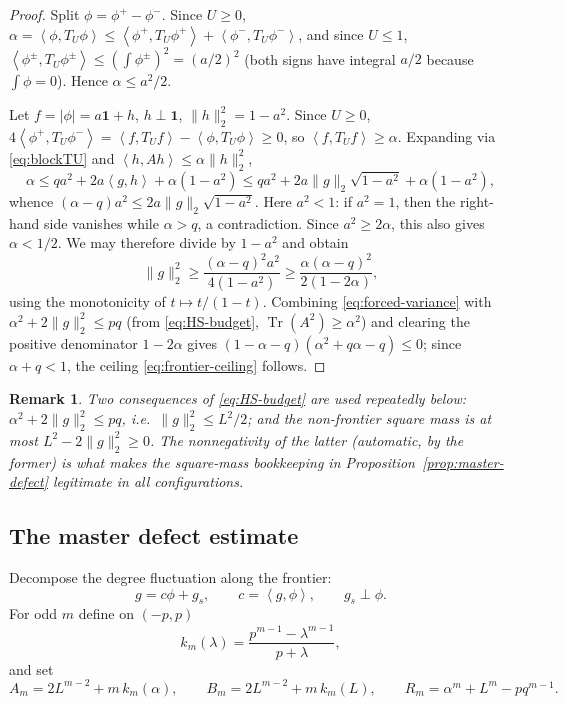 \documentclass[11pt]{article}
\newtheorem{remark}[theorem]{Remark}
\newcommand{\one}{\mathbf 1}
\newcommand{\ip}[2]{\left\langle #1,#2\right\rangle}
\newcommand{\Tr}{\operatorname{Tr}}
\begin{document}
\begin{proof}
Split $\phi=\phi^+-\phi^-$.  Since $U\ge0$,
$\alpha=\ip{\phi}{T_U\phi}\le\ip{\phi^+}{T_U\phi^+}+\ip{\phi^-}{T_U\phi^-}$,
and since $U\le1$, $\ip{\phi^\pm}{T_U\phi^\pm}\le(\int\phi^\pm)^2=(a/2)^2$
(both signs have integral $a/2$ because $\int\phi=0$).  Hence $\alpha\le a^2/2$.

Let $f=|\phi|=a\one+h$, $h\perp\one$, $\|h\|_2^2=1-a^2$.  Since $U\ge0$,
$4\ip{\phi^+}{T_U\phi^-}=\ip f{T_Uf}-\ip\phi{T_U\phi}\ge0$, so
$\ip f{T_Uf}\ge\alpha$.  Expanding via \eqref{eq:blockTU} and
$\ip h{Ah}\le\alpha\|h\|_2^2$,
\[
        \alpha\le qa^2+2a\ip gh+\alpha(1-a^2)
        \le qa^2+2a\|g\|_2\sqrt{1-a^2}+\alpha(1-a^2),
\]
whence $(\alpha-q)a^2\le2a\|g\|_2\sqrt{1-a^2}$.  Here $a^2<1$:
if $a^2=1$, then the right-hand side vanishes while $\alpha>q$, a
contradiction.  Since $a^2\ge2\alpha$, this also gives $\alpha<1/2$.  We may
therefore divide by $1-a^2$ and obtain
\[
        \|g\|_2^2\ge\frac{(\alpha-q)^2a^2}{4(1-a^2)}
        \ge\frac{\alpha(\alpha-q)^2}{2(1-2\alpha)},
\]
using the monotonicity of $t\mapsto t/(1-t)$.
Combining \eqref{eq:forced-variance} with $\alpha^2+2\|g\|_2^2\le pq$ (from
\eqref{eq:HS-budget}, $\Tr(A^2)\ge\alpha^2$) and clearing the positive
denominator $1-2\alpha$ gives
$(1-\alpha-q)(\alpha^2+q\alpha-q)\le0$; since $\alpha+q<1$, the ceiling
\eqref{eq:frontier-ceiling} follows.
\end{proof}

\begin{remark}\label{rmk:budget-sign}
Two consequences of \eqref{eq:HS-budget} are used repeatedly below:
$\alpha^2+2\|g\|_2^2\le pq$, i.e.\ $\|g\|_2^2\le L^2/2$; and the non-frontier
square mass is at most $L^2-2\|g\|_2^2\ge0$.  The nonnegativity of the latter
(automatic, by the former) is what makes the square-mass bookkeeping in
Proposition~\ref{prop:master-defect} legitimate in all configurations.
\end{remark}

\subsection{The master defect estimate}

Decompose the degree fluctuation along the frontier:
\begin{equation}\label{eq:g-decomp}
        g=c\phi+g_s,\qquad c=\ip g\phi,\qquad g_s\perp\phi .
\end{equation}
For odd $m$ define on $(-p,p)$
\begin{equation}\label{eq:kdef}
        k_m(\lambda)=\frac{p^{m-1}-\lambda^{m-1}}{p+\lambda},
\end{equation}
and set
\begin{equation}\label{eq:AB-def}
        A_m=2L^{m-2}+m\,k_m(\alpha),
        \qquad
        B_m=2L^{m-2}+m\,k_m(L),
        \qquad
        R_m=\alpha^m+L^m-pq^{m-1}.
\end{equation}
\end{document}
